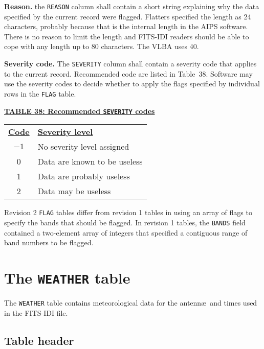 \documentclass[twoside]{article}
\newcommand{\Hi}[1]{\textcolor{hicol}{#1}}
\newcommand{\hicol}{\color{hicol}}
\begin{document}
{\bf Reason.} the {\tt REASON} column shall contain a short string
explaining why the data specified by the current record were flagged.
\Hi{Flatters\cite{F98} specified the length as 24 characters, probably
because that is the internal length in the AIPS software.  There is no
reason to limit the length and FITS-IDI readers should be able to cope
with any length up to 80 characters.  The VLBA uses 40.}

{\bf Severity code.}  The {\tt SEVERITY} column shall contain a
severity code that applies to the current record.  Recommended code
are listed in Table~\Hi{38}.  Software may use the severity codes to
decide whether to apply the flags specified by individual \Hi{rows in
  the {\tt FLAG} table.}

\begin{center}
\underline{\bf{TABLE \Hi{38}: Recommended {\tt SEVERITY} codes}} \\
\begin{tabular}{cl}
\noalign{\vspace{2pt}}
\underline{{\bf Code\vphantom{y}}} & \underline{\bf{Severity level}}\\
\noalign{\vspace{2pt}}
$-1$ & No severity level assigned \\
 0 & Data are known to be useless \\
 1 & Data are probably useless \\
 2 & Data may be useless
\end{tabular}
\end{center}

Revision 2 {\tt FLAG} tables differ from revision 1 tables in using an
array of flags to specify the bands that should be flagged.  In
revision 1 tables, the {\tt BANDS} field contained a two-element array
of integers that specified a contiguous range of band numbers to be
flagged.

\hicol

\section{The {\tt WEATHER} table}
\label{s:WX}

The {\tt WEATHER} table contains meteorological data for the antenn\ae\
and times used in the FITS-IDI file.

\subsection{Table header}
\end{document}
